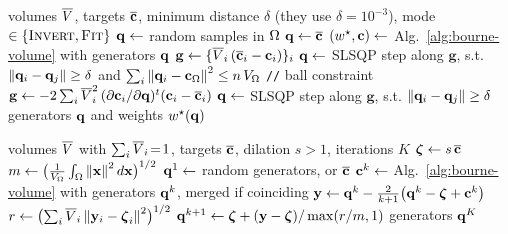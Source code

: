 \documentclass[main.tex]{subfiles}
\begin{document}
\begin{algorithm}[H]
  \caption{Inversion and fitting by \citet{Bourne2025Inverting}.}
  \label{alg:bourne2025}
  \begin{algorithmic}[1]
    \Require volumes $\overline{V}$, targets $\overline{\mathbf{c}}$, minimum distance $\delta$ (they use $\delta \!=\! 10^{-3}$), mode $\in \{\textsc{Invert}, \textsc{Fit}\}$
      \State $\mathbf{q} \gets$ random samples in $\Omega$
    \Else
      \State $\mathbf{q} \gets \overline{\mathbf{c}}$ 
    \EndIf
    \Repeat {}
      \State $(w^\star, \mathbf{c}) \gets$ Alg.~\ref{alg:bourne-volume} with generators $\mathbf{q}$
        \State $\mathbf{g} \gets \{\overline{V}_i\,(\overline{\mathbf{c}}_i - \mathbf{c}_i)\}_i$ 
        \State $\mathbf{q} \gets$ SLSQP step along $\mathbf{g}$, s.t. $\left\lVert \mathbf{q}_i - \mathbf{q}_j \right\rVert \ge \delta$
        \Statex \hspace{4.5em} and $\sum_i \left\lVert \mathbf{q}_i - \mathbf{c}_{\Omega} \right\rVert^2 \le n\,V_{\Omega}$ \hfill \texttt{//} ball constraint
      \Else
        \State $\mathbf{g} \gets -2 \sum_i \overline{V}_i^2\,(\partial\mathbf{c}_i / \partial\mathbf{q})^{t} (\mathbf{c}_i - \overline{\mathbf{c}}_i)$ 
        \State $\mathbf{q} \gets$ SLSQP step along $\mathbf{g}$, s.t. $\left\lVert \mathbf{q}_i - \mathbf{q}_j \right\rVert \ge \delta$
      \EndIf
    \State \Return generators $\mathbf{q}$ and weights $w^\star(\mathbf{q})$
  \end{algorithmic}
\end{algorithm}

\begin{algorithm}[H]
  \caption{Projection--dilation fitting by \citet{Bourne2026ConvexOrder}, subgradient variant.}
  \label{alg:bourne2026-subgradient}
  \begin{algorithmic}[1]
    \Require volumes $\overline{V}$ with $\sum_i \overline{V}_i \!=\! 1$, targets $\overline{\mathbf{c}}$, dilation $s \!>\! 1$, iterations $K$
    \State $\boldsymbol{\zeta} \gets s\,\overline{\mathbf{c}}$ 
    \State $m \gets \bigl( \tfrac{1}{V_{\Omega}} \int_\Omega \left\lVert \mathbf{x} \right\rVert^2 d\mathbf{x} \bigr)^{1/2}$ 
    \State $\mathbf{q}^1 \gets$ random generators, or $\overline{\mathbf{c}}$
      \State $\mathbf{c}^k \gets$ Alg.~\ref{alg:bourne-volume} with generators $\mathbf{q}^k$, merged if coinciding
      \State $\mathbf{y} \gets \mathbf{q}^k - \tfrac{2}{k+1} \bigl( \mathbf{q}^k - \boldsymbol{\zeta} + \mathbf{c}^k \bigr)$ 
      \State $r \gets \bigl( \sum_i \overline{V}_i \left\lVert \mathbf{y}_i - \boldsymbol{\zeta}_i \right\rVert^2 \bigr)^{1/2}$
      \State $\mathbf{q}^{k+1} \gets \boldsymbol{\zeta} + (\mathbf{y} - \boldsymbol{\zeta}) / \max(r/m, 1)$ 
    \EndFor
    \State \Return generators $\mathbf{q}^{K}$
  \end{algorithmic}
\end{algorithm}
\end{document}
